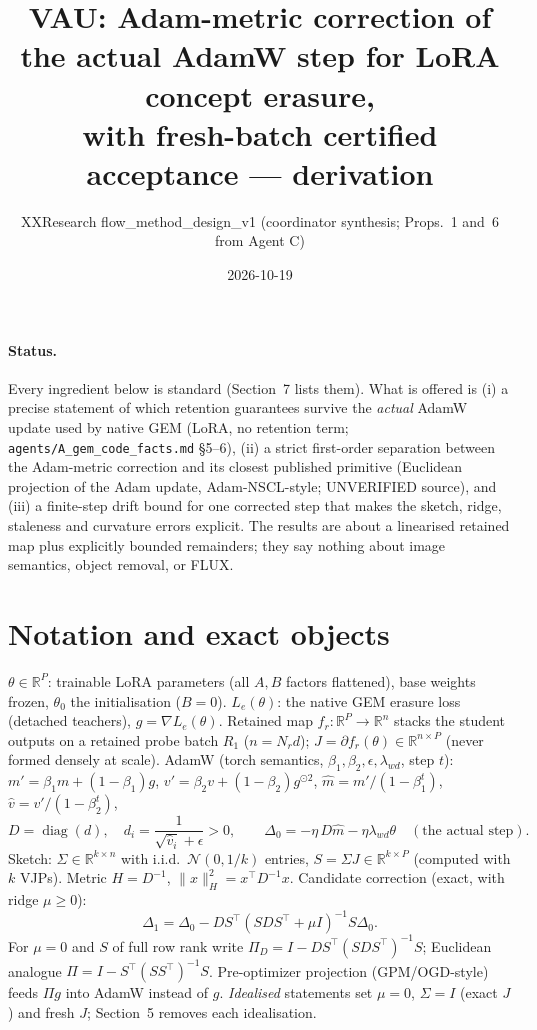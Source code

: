 \documentclass[11pt]{article}
\title{VAU: Adam-metric correction of the actual AdamW step for LoRA concept erasure,\\ with fresh-batch certified acceptance --- derivation}
\author{XXResearch flow\_method\_design\_v1 (coordinator synthesis; Props.~1 and~6 from Agent C)}
\date{2026-10-19}
\theoremstyle{remark}
\begin{document}
\maketitle

\paragraph{Status.} Every ingredient below is standard (Section~7 lists them). What is offered is (i) a precise
statement of which retention guarantees survive the \emph{actual} AdamW update used by native GEM (LoRA, no retention
term; \texttt{agents/A\_gem\_code\_facts.md} \S5--6), (ii) a strict first-order separation between the Adam-metric correction
and its closest published primitive (Euclidean projection of the Adam update, Adam-NSCL-style; UNVERIFIED source), and (iii) a
finite-step drift bound for one corrected step that makes the sketch, ridge, staleness and curvature errors explicit.
The results are about a linearised retained map plus explicitly bounded remainders; they say nothing about image
semantics, object removal, or FLUX.

\section{Notation and exact objects}
$\theta\in\mathbb{R}^P$: trainable LoRA parameters (all $A,B$ factors flattened), base weights frozen, $\theta_0$ the
initialisation ($B=0$). $L_e(\theta)$: the native GEM erasure loss (detached teachers), $g=\nabla L_e(\theta)$.
Retained map $f_r:\mathbb{R}^P\to\mathbb{R}^{n}$ stacks the student outputs on a retained probe batch $R_1$ ($n=N_r d$);
$J=\partial f_r(\theta)\in\mathbb{R}^{n\times P}$ (never formed densely at scale).
AdamW (torch semantics, $\beta_1,\beta_2,\epsilon,\lambda_{wd}$, step $t$):
$m'=\beta_1 m+(1-\beta_1)g$, $v'=\beta_2 v+(1-\beta_2)g^{\odot2}$, $\hat m=m'/(1-\beta_1^t)$, $\hat v=v'/(1-\beta_2^t)$,
\[ D=\operatorname{diag}(d),\quad d_i=\frac{1}{\sqrt{\hat v_i}+\epsilon}>0,\qquad
\Delta_0=-\eta\,D\hat m-\eta\lambda_{wd}\theta\quad(\text{the actual step}). \]
Sketch: $\Sigma\in\mathbb{R}^{k\times n}$ with i.i.d.\ $\mathcal N(0,1/k)$ entries, $S=\Sigma J\in\mathbb{R}^{k\times P}$
(computed with $k$ VJPs). Metric $H=D^{-1}$, $\|x\|_H^2=x^\top D^{-1}x$.
Candidate correction (exact, with ridge $\mu\ge0$):
\[ \Delta_1=\Delta_0-DS^\top (SDS^\top+\mu I)^{-1}S\Delta_0 . \tag{1}\]
For $\mu=0$ and $S$ of full row rank write $\Pi_D=I-DS^\top(SDS^\top)^{-1}S$; Euclidean analogue
$\Pi=I-S^\top(SS^\top)^{-1}S$. Pre-optimizer projection (GPM/OGD-style) feeds $\Pi g$ into AdamW instead of $g$.
\emph{Idealised} statements set $\mu=0$, $\Sigma=I$ (exact $J$) and fresh $J$; Section~5 removes each idealisation.
\end{document}
